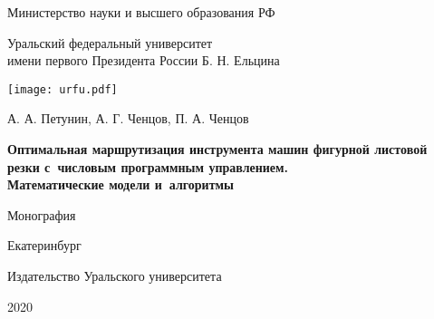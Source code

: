 
\thispagestyle{empty}

\setcounter{page}{1}
\begin{center}
{\small
Министерство науки и высшего образования РФ

Уральский федеральный университет
\\
имени первого Президента России
Б. Н. Ельцина
\\
}
\texttt{[image: urfu.pdf]}

\vspace{0pt plus2fill}
А. А. Петунин,
А. Г. Ченцов,
П. А. Ченцов

\vspace{0pt plus1fill}
{\bf
Оптимальная маршрутизация инструмента машин фигурной
листовой резки с~числовым
программным управлением.\\
Математические модели и~алгоритмы}

\vspace{3cm}
Монография

\vspace{0pt plus6fill}
Екатеринбург

Издательство Уральского университета

2020
\end{center}
\newpage
